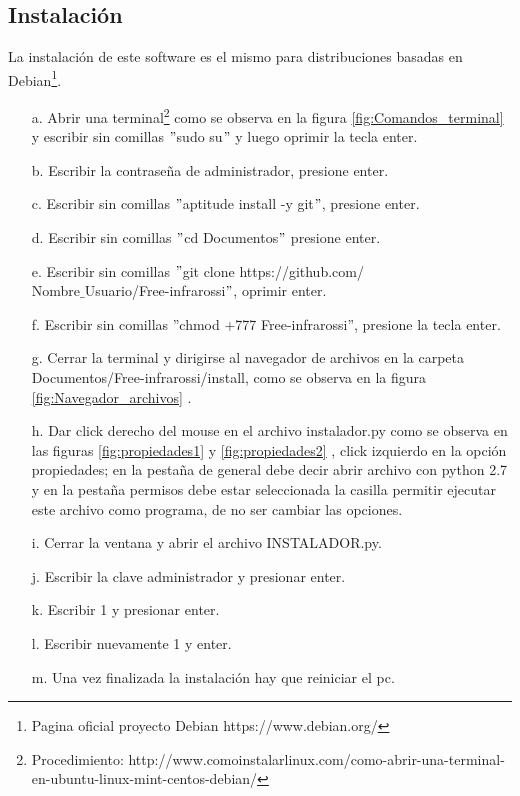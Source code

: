 \documentclass[12]{article}
\begin{document}
\begin{multicols}{2}
\subsection{Instalación}
La instalación de este software es el mismo para distribuciones basadas en Debian\footnote{Pagina oficial proyecto Debian https://www.debian.org/}.
\begin{enumerate}
\item[a.] Abrir una terminal\footnote{Procedimiento: http://www.comoinstalarlinux.com/como-abrir-una-terminal-en-ubuntu-linux-mint-centos-debian/} como se observa en la figura \ref{fig:Comandos_terminal} y escribir sin comillas $"$sudo su$"$ y luego oprimir la tecla enter.\\
\item[b.] Escribir la contraseña de administrador, presione enter.\\
\item[c.] Escribir sin comillas $"$aptitude install -y git$"$, presione enter.\\
\item[d.] Escribir sin comillas $"$cd Documentos$"$ presione enter.\\
\item[e.] Escribir sin comillas $"$git  clone  https://github.com/\\Nombre$\_$Usuario/Free-infrarossi$"$, oprimir enter.\\
\item[f.] Escribir sin comillas $”$chmod +777 Free-infrarossi$”$, presione la tecla enter.\\
\item[g.] Cerrar la terminal y dirigirse al navegador de archivos en la carpeta Documentos/Free-infrarossi/install, como se observa en la figura \ref{fig:Navegador_archivos} .\\
\item[h.] Dar click derecho del mouse en el archivo instalador.py como se observa en las figuras \ref{fig:propiedades1} y \ref{fig:propiedades2} , click izquierdo en la opción propiedades; en la pestaña de general debe decir abrir archivo con python 2.7 y en la pestaña permisos debe estar seleccionada la casilla permitir ejecutar este archivo como programa, de no ser cambiar las opciones.
\item[i.] Cerrar la ventana y abrir el archivo INSTALADOR.py.
\item[j.] Escribir la clave administrador y presionar enter.
\item[k.] Escribir  1 y presionar enter.
\item[l.] Escribir nuevamente 1 y enter.
\item[m.] Una vez finalizada la instalación hay que reiniciar el pc.
\end{enumerate}


\end{multicols}
\end{document}
